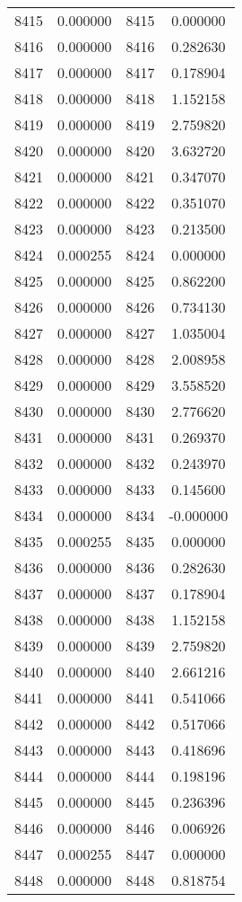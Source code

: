 \documentclass[12pt]{article}
\begin{document}
\begin{longtable}{@{}cccc@{}}
8415 & 0.000000 & 8415 & 0.000000 \\
8416 & 0.000000 & 8416 & 0.282630 \\
8417 & 0.000000 & 8417 & 0.178904 \\
8418 & 0.000000 & 8418 & 1.152158 \\
8419 & 0.000000 & 8419 & 2.759820 \\
8420 & 0.000000 & 8420 & 3.632720 \\
8421 & 0.000000 & 8421 & 0.347070 \\
8422 & 0.000000 & 8422 & 0.351070 \\
8423 & 0.000000 & 8423 & 0.213500 \\
8424 & 0.000255 & 8424 & 0.000000 \\
8425 & 0.000000 & 8425 & 0.862200 \\
8426 & 0.000000 & 8426 & 0.734130 \\
8427 & 0.000000 & 8427 & 1.035004 \\
8428 & 0.000000 & 8428 & 2.008958 \\
8429 & 0.000000 & 8429 & 3.558520 \\
8430 & 0.000000 & 8430 & 2.776620 \\
8431 & 0.000000 & 8431 & 0.269370 \\
8432 & 0.000000 & 8432 & 0.243970 \\
8433 & 0.000000 & 8433 & 0.145600 \\
8434 & 0.000000 & 8434 & -0.000000 \\
8435 & 0.000255 & 8435 & 0.000000 \\
8436 & 0.000000 & 8436 & 0.282630 \\
8437 & 0.000000 & 8437 & 0.178904 \\
8438 & 0.000000 & 8438 & 1.152158 \\
8439 & 0.000000 & 8439 & 2.759820 \\
8440 & 0.000000 & 8440 & 2.661216 \\
8441 & 0.000000 & 8441 & 0.541066 \\
8442 & 0.000000 & 8442 & 0.517066 \\
8443 & 0.000000 & 8443 & 0.418696 \\
8444 & 0.000000 & 8444 & 0.198196 \\
8445 & 0.000000 & 8445 & 0.236396 \\
8446 & 0.000000 & 8446 & 0.006926 \\
8447 & 0.000255 & 8447 & 0.000000 \\
8448 & 0.000000 & 8448 & 0.818754 \\

\end{longtable}
\end{document}
